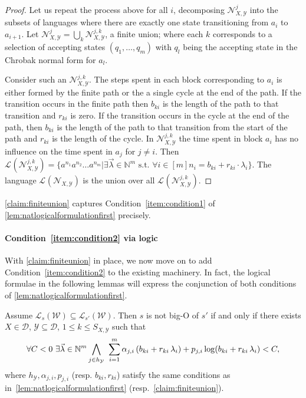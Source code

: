 \documentclass[10pt,a4paper]{amsart}
\numberwithin{equation}{section}
\theoremstyle{plain}
\theoremstyle{definition}
\theoremstyle{remark}
\newcommand\lng[2]{\mathcal{L}_{#1}(#2)}
\newcommand\chr{a}
\newcommand\basevecraw{b}
\newcommand\pvecraw{r}
\newcommand\adm{\mathcal{D}}
\newcommand\wa{\mathcal{W}}
\begin{document}
\begin{proof}
Let us repeat the process above for all $i$, decomposing $\mathcal{N}_{X,\mathcal{Y}}^j$ into the subsets of languages where there are exactly one state transitioning from $\chr_{i}$ to $\chr_{i+1}$. Let $\mathcal{N}_{X,\mathcal{Y}}^j = \bigcup_k \mathcal{N}_{X,\mathcal{Y}}^{j,k}$, a finite union; where each $k$ corresponds to a selection of accepting states $(q_1,\dots,q_m)$ with $q_l$ being the accepting state in the Chrobak normal form for $\chr_l$.

Consider such an $\mathcal{N}_{X,\mathcal{Y}}^{j,k}$. The steps spent in each block corresponding to $\chr_i$ is either formed by the finite path or the a single cycle at the end of the path. If the transition occurs in the finite path then $\basevecraw_{ki}$ is the length of the path to that transition and $\pvecraw_{ki}$ is zero. If the transition occurs in the cycle at the end of the path, then $\basevecraw_{ki}$ is the length of the path to that transition from the start of the path and $\pvecraw_{ki}$ is the length of the cycle. In $\mathcal{N}_{X,\mathcal{Y}}^{j,k}$ the time spent in block $\chr_i$ has no influence on the time spent in $\chr_j$ for $j\ne i$. Then $\lng{}{\mathcal{N}_{X,\mathcal{Y}}^{j,k}} = \{\chr^{n_1}\chr^{n_2}\dots \chr^{n_m} |  \exists \vec{\lambda}\in\mathbb{N}^m \text{ s.t. }\forall i\in[m] n_i = \basevecraw_{ki} + \pvecraw_{ki}\cdot \lambda_i \}$. The language $\lng{}{\mathcal{N}_{X,\mathcal{Y}}}$ is the union over all $\lng{}{\mathcal{N}_{X,\mathcal{Y}}^{j,k}}$.
\end{proof}

\cref{claim:finiteunion} captures Condition~\ref{item:condition1} of \cref{lem:natlogicalformulationfirst} precisely.
\paragraph*{Condition~\ref{item:condition2} via logic}
With \cref{claim:finiteunion} in place, we now move on to add   Condition~\ref{item:condition2} to the existing machinery. In fact, the logical formulae in the following lemmas will express the conjunction of   both conditions of \cref{lem:natlogicalformulationfirst}.

\begin{lem}\label{lem:natlogicalformulation}
Assume  $\lng{s}{\wa}\subseteq \lng{s'}{\wa}$. Then
$s$ is not big-O of $s'$ if and only if there exists  $X\in\adm$, $\mathcal{Y}\subseteq\adm$, $1\le k\le S_{X,\mathcal{Y}}$ such that
\
\[
\forall C < 0\  \exists \vec{\lambda} \in \mathbb{N}^m \\
\bigwedge_{j\in h_\mathcal{Y}}\ \sum_{i=1}^m \alpha_{j,i} \,(\basevecraw_{ki} + \pvecraw_{ki} \, \lambda_i) +  p_{j,i}\log(\basevecraw_{ki} + \pvecraw_{ki} \,\lambda_i) < C,
\]
where $h_\mathcal{Y}, \alpha_{j,i}, p_{j,i}$ (resp.  $\basevecraw_{ki},  \pvecraw_{ki}$) satisfy the same conditions as in~\cref{lem:natlogicalformulationfirst} (resp.~\ref{claim:finiteunion}).
\end{lem}
\end{document}
